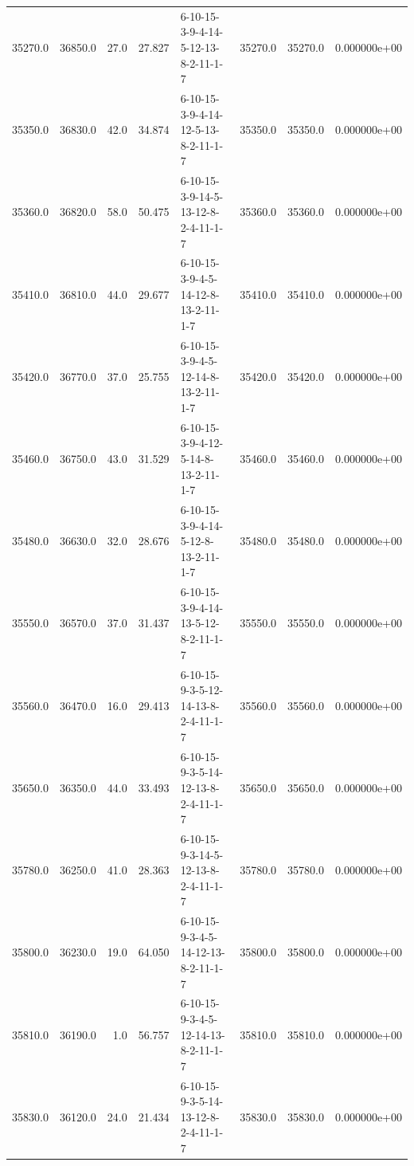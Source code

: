 \begin{tabular}{rrrrlrrr}
 35270.0 &  36850.0 &           27.0 &             27.827 &  6-10-15-3-9-4-14-5-12-13-8-2-11-1-7 &       35270.0 &         35270.0 &  0.000000e+00 \\
 35350.0 &  36830.0 &           42.0 &             34.874 &  6-10-15-3-9-4-14-12-5-13-8-2-11-1-7 &       35350.0 &         35350.0 &  0.000000e+00 \\
 35360.0 &  36820.0 &           58.0 &             50.475 &  6-10-15-3-9-14-5-13-12-8-2-4-11-1-7 &       35360.0 &         35360.0 &  0.000000e+00 \\
 35410.0 &  36810.0 &           44.0 &             29.677 &  6-10-15-3-9-4-5-14-12-8-13-2-11-1-7 &       35410.0 &         35410.0 &  0.000000e+00 \\
 35420.0 &  36770.0 &           37.0 &             25.755 &  6-10-15-3-9-4-5-12-14-8-13-2-11-1-7 &       35420.0 &         35420.0 &  0.000000e+00 \\
 35460.0 &  36750.0 &           43.0 &             31.529 &  6-10-15-3-9-4-12-5-14-8-13-2-11-1-7 &       35460.0 &         35460.0 &  0.000000e+00 \\
 35480.0 &  36630.0 &           32.0 &             28.676 &  6-10-15-3-9-4-14-5-12-8-13-2-11-1-7 &       35480.0 &         35480.0 &  0.000000e+00 \\
 35550.0 &  36570.0 &           37.0 &             31.437 &  6-10-15-3-9-4-14-13-5-12-8-2-11-1-7 &       35550.0 &         35550.0 &  0.000000e+00 \\
 35560.0 &  36470.0 &           16.0 &             29.413 &  6-10-15-9-3-5-12-14-13-8-2-4-11-1-7 &       35560.0 &         35560.0 &  0.000000e+00 \\
 35650.0 &  36350.0 &           44.0 &             33.493 &  6-10-15-9-3-5-14-12-13-8-2-4-11-1-7 &       35650.0 &         35650.0 &  0.000000e+00 \\
 35780.0 &  36250.0 &           41.0 &             28.363 &  6-10-15-9-3-14-5-12-13-8-2-4-11-1-7 &       35780.0 &         35780.0 &  0.000000e+00 \\
 35800.0 &  36230.0 &           19.0 &             64.050 &  6-10-15-9-3-4-5-14-12-13-8-2-11-1-7 &       35800.0 &         35800.0 &  0.000000e+00 \\
 35810.0 &  36190.0 &            1.0 &             56.757 &  6-10-15-9-3-4-5-12-14-13-8-2-11-1-7 &       35810.0 &         35810.0 &  0.000000e+00 \\
 35830.0 &  36120.0 &           24.0 &             21.434 &  6-10-15-9-3-5-14-13-12-8-2-4-11-1-7 &       35830.0 &         35830.0 &  0.000000e+00 \\

\end{tabular}
